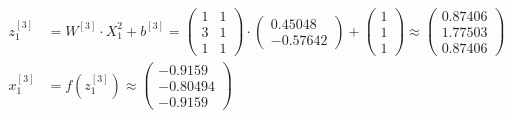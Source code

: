 \documentclass[12pt]{article}
\begin{document}
\begin{enumerate}[leftmargin=\labelsep]
\begin{align*}
                z^{[3]}_1 &= {W}^{[3]} \cdot {X}^{2}_1 + {b}^{[3]} = \begin{pmatrix} 1 & 1 \\ 3 & 1 \\ 1 & 1\end{pmatrix} \cdot  \begin{pmatrix} 0.45048 \\ -0.57642\end{pmatrix} +
                \begin{pmatrix} 1 \\ 1 \\ 1\end{pmatrix} \approx \begin{pmatrix} 0.87406 \\ 1.77503 \\ 0.87406\end{pmatrix} \\
                {x}^{[3]}_1 &= f\left({z}^{[3]}_1\right) \approx \begin{pmatrix} -0.9159 \\ -0.80494 \\ -0.9159\end{pmatrix}
            \end{align*}
            \endgroup


\end{enumerate}
\end{document}
